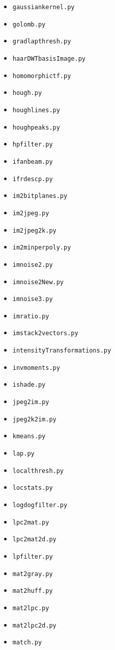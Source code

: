 \documentclass[11pt]{article}
\begin{document}
\begin{itemize}[leftmargin=1.5em]
\item \texttt{gaussiankernel.py}
\item \texttt{golomb.py}
\item \texttt{gradlapthresh.py}
\item \texttt{haarDWTbasisImage.py}
\item \texttt{homomorphictf.py}
\item \texttt{hough.py}
\item \texttt{houghlines.py}
\item \texttt{houghpeaks.py}
\item \texttt{hpfilter.py}
\item \texttt{ifanbeam.py}
\item \texttt{ifrdescp.py}
\item \texttt{im2bitplanes.py}
\item \texttt{im2jpeg.py}
\item \texttt{im2jpeg2k.py}
\item \texttt{im2minperpoly.py}
\item \texttt{imnoise2.py}
\item \texttt{imnoise2New.py}
\item \texttt{imnoise3.py}
\item \texttt{imratio.py}
\item \texttt{imstack2vectors.py}
\item \texttt{intensityTransformations.py}
\item \texttt{invmoments.py}
\item \texttt{ishade.py}
\item \texttt{jpeg2im.py}
\item \texttt{jpeg2k2im.py}
\item \texttt{kmeans.py}
\item \texttt{lap.py}
\item \texttt{localthresh.py}
\item \texttt{locstats.py}
\item \texttt{logdogfilter.py}
\item \texttt{lpc2mat.py}
\item \texttt{lpc2mat2d.py}
\item \texttt{lpfilter.py}
\item \texttt{mat2gray.py}
\item \texttt{mat2huff.py}
\item \texttt{mat2lpc.py}
\item \texttt{mat2lpc2d.py}
\item \texttt{match.py}

\end{itemize}
\end{document}
